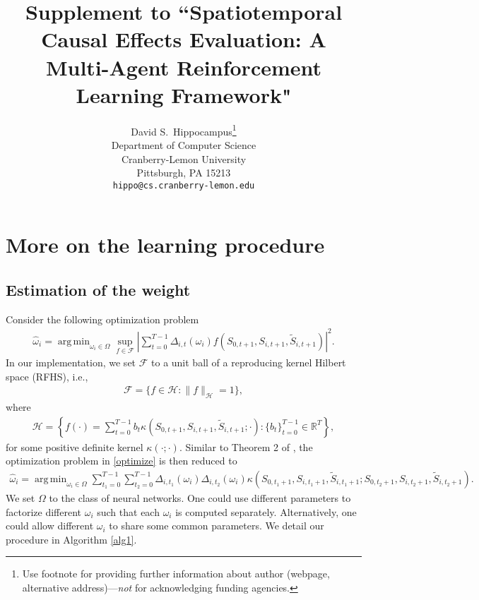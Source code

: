 \documentclass{article}
\title{Supplement to ``Spatiotemporal Causal Effects Evaluation: A Multi-Agent Reinforcement Learning Framework"}
\author{%
	David S.~Hippocampus\thanks{Use footnote for providing further information
		about author (webpage, alternative address)---\emph{not} for acknowledging
		funding agencies.} \\
	Department of Computer Science\\
	Cranberry-Lemon University\\
	Pittsburgh, PA 15213 \\
	\texttt{hippo@cs.cranberry-lemon.edu} \\
}
\DeclareMathOperator*{\argmin}{arg\,min}
\begin{document}
	
\maketitle

\appendix 
\section{More on the learning procedure}
\subsection{Estimation of the weight}\label{sec:weight}
Consider the following optimization problem
\begin{eqnarray}\label{optimize}
	\widehat{\omega}_i=\argmin_{\omega_i\in \Omega} \sup_{f\in \mathcal{F}} \left|\sum_{t=0}^{T-1} \Delta_{i,t}(\omega_i) f(S_{0,t+1},S_{i,t+1},\widetilde{S}_{i,t+1})\right|^2.
\end{eqnarray}
In our implementation, we set $\mathcal{F}$ to a unit ball of a reproducing kernel Hilbert space (RFHS), i.e., 
\begin{eqnarray*}
	\mathcal{F}=\{f\in \mathcal{H}:\|f\|_{\mathcal{H}}=1\},
\end{eqnarray*}
where %
\begin{eqnarray*}
	\mathcal{H}=\left\{f(\cdot)=\sum_{t=0}^{T-1} b_t \kappa(S_{0,t+1},S_{i,t+1},\widetilde{S}_{i,t+1};\cdot): \{b_t\}_{t=0}^{T-1}\in \mathbb{R}^{T} \right\},
\end{eqnarray*}
for some positive definite kernel $\kappa(\cdot;\cdot)$. Similar to Theorem 2 of \cite{liu2018}, the optimization problem in \eqref{optimize} is then reduced to 
\begin{eqnarray*}
	\widehat{\omega}_i=\argmin_{\omega_i\in \Omega} \sum_{t_1=0}^{T-1} \sum_{t_2=0}^{T-1} \Delta_{i,t_1}(\omega_i)\Delta_{i,t_2}(\omega_i) \kappa(S_{0,t_1+1},S_{i,t_1+1},\widetilde{S}_{i,t_1+1};S_{0,t_2+1},S_{i,t_2+1},\widetilde{S}_{i,t_2+1}). 
\end{eqnarray*}
We set $\Omega$ to the class of neural networks. One could use different parameters to factorize different $\omega_i$ such that each $\widehat{\omega}_i$ is computed separately. Alternatively, one could allow different $\omega_i$ to share some common parameters. We detail our procedure in Algorithm \ref{alg1}. 
\end{document}
